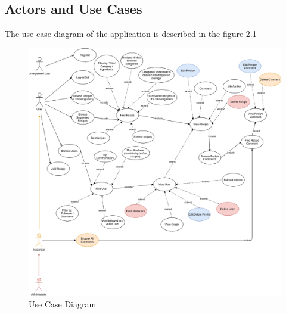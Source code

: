 \documentclass[a4paper]{report}
\begin{document}
\subsection{Actors and Use Cases}
The use case diagram of the application is described in the figure 2.1

\begin{figure}[htpb]
	\centering
	\includegraphics[scale=0.4]{img/UseCaseDiagram.png}
	\caption{Use Case Diagram}
\end{figure}
\end{document}
